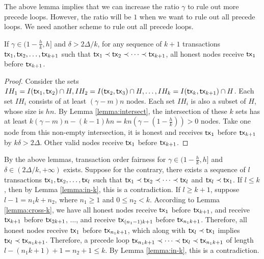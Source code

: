 \documentclass[runningheads]{llncs}
\begin{document}
The above lemma implies that we can increase the ratio $\gamma$ to rule out more precede loops. However, the ratio will be $1$ when we want to rule out all precede loops. We need another scheme to rule out all precede loops. 

\begin{lemma}\label{lemma:cross-k}
    If $\gamma \in (1-\frac{h}{k}, h]$ and $\delta > 2\Delta/k$, for any sequence of $k+1$ transactions $\mathsf{tx}_1, \mathsf{tx}_2, \dots, \mathsf{tx}_{k+1}$ such that $\mathsf{tx}_1\prec \mathsf{tx}_2\prec \cdots \prec \mathsf{tx}_{k+1}$, all honest nodes receive $\mathsf{tx}_1$ before $\mathsf{tx}_{k+1}$.
\end{lemma}
\begin{proof}
    Consider the sets $IH_1 = I(\mathsf{tx}_1, \mathsf{tx}_2)\cap H, IH_2 = I(\mathsf{tx}_2, \mathsf{tx}_3)\cap H, \dots, IH_k=I(\mathsf{tx}_k, \mathsf{tx}_{k+1})\cap H$. Each set $IH_i$ consists of at least $(\gamma-m)n$ nodes. Each set $IH_i$ is also a subset of $H$, whose size is $hn$. By Lemma \ref{lemma:intersect}, the intersection of these $k$ sets has at least $k(\gamma-m)n - (k-1)hn = kn(\gamma - (1-\frac{h}{k})) > 0$ nodes. Take one node from this non-empty intersection, it is honest and receives $\mathsf{tx}_1$ before $\mathsf{tx}_{k+1}$ by $k\delta > 2\Delta$. Other valid nodes receive $\mathsf{tx}_1$ before $\mathsf{tx}_{k+1}$. 
\end{proof}

By the above lemmas, transaction order fairness for $\gamma\in(1-\frac{h}{k}, h]$ and $\delta\in(2\Delta/k, +\infty)$ exists. Suppose for the contrary, there exists a sequence of $l$ transactions $\mathsf{tx}_1, \mathsf{tx}_2, \dots, \mathsf{tx}_l$ such that $\mathsf{tx}_1\prec \mathsf{tx}_2\prec \cdots \prec \mathsf{tx}_l$ and $\mathsf{tx}_l\prec \mathsf{tx}_1$. If $l\le k$, then by Lemma \ref{lemma:in-k}, this is a contradiction. If $l\ge k+1$, suppose $l-1=n_1 k + n_2$, where $n_1 \ge 1$ and $0 \le n_2 <k$. According to Lemma \ref{lemma:cross-k}, we have all honest nodes receive $\mathsf{tx}_1$ before $\mathsf{tx}_{k+1}$, and receive $\mathsf{tx}_{k+1}$ before $\mathsf{tx}_{2k+1}$, ..., and receive $\mathsf{tx}_{(n_1-1)k+1}$ before $\mathsf{tx}_{n_1 k +1}$. Therefore, all honest nodes receive $\mathsf{tx}_1$ before $\mathsf{tx}_{n_1 k+1}$, which along with $\mathsf{tx}_l\prec \mathsf{tx}_1$ implies $\mathsf{tx}_l\prec \mathsf{tx}_{n_1 k +1}$. Therefore, a precede loop $\mathsf{tx}_{n_1 k+1} \prec \cdots \prec \mathsf{tx}_l \prec \mathsf{tx}_{n_1 k +1}$ of length $l-(n_1 k + 1)+1 = n_2+1\le k$. By Lemma \ref{lemma:in-k}, this is a contradiction.

\begin{credits}
\subsubsection{\ackname} 
\subsubsection{\discintname}

\end{credits}
%
%
%


%
\end{document}
